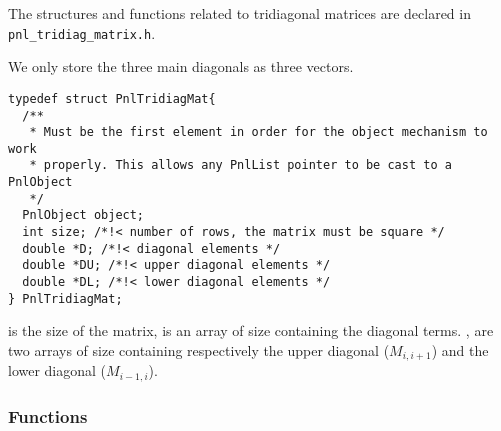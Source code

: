 The structures and functions related to tridiagonal matrices are declared in
\verb!pnl_tridiag_matrix.h!. 

We only store the three main diagonals as three vectors.

\begin{verbatim}
typedef struct PnlTridiagMat{
  /**
   * Must be the first element in order for the object mechanism to work
   * properly. This allows any PnlList pointer to be cast to a PnlObject
   */
  PnlObject object; 
  int size; /*!< number of rows, the matrix must be square */
  double *D; /*!< diagonal elements */
  double *DU; /*!< upper diagonal elements */
  double *DL; /*!< lower diagonal elements */
} PnlTridiagMat;
\end{verbatim}

 is the size of the matrix,  is an array of size 
containing the diagonal terms. ,
 are two arrays of size  containing respectively the upper
diagonal ($M_{i, i+1}$) and the lower diagonal ($M_{i-1, i}$). 
\subsubsection{Functions}
